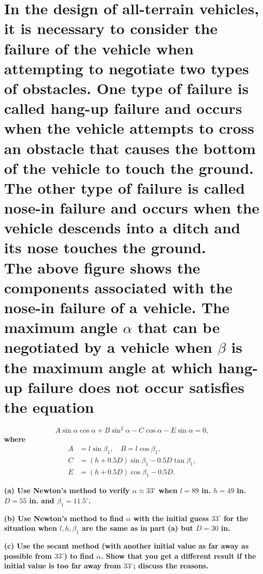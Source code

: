 \documentclass[a4paper]{article}
\begin{document}
\section*{In the design of all-terrain vehicles, it is necessary to consider the failure of the vehicle when attempting to negotiate two types of obstacles. One type of failure is called hang-up failure and occurs when the vehicle attempts to cross an obstacle that causes the bottom of the vehicle to touch the ground. The other type of failure is called nose-in failure and occurs when the vehicle descends into a ditch and its nose touches the ground.\\
The above figure shows the components associated with the nose-in failure of a vehicle. The maximum angle $\alpha$ that can be negotiated by a vehicle when $\beta$ is the maximum angle at which hang-up failure does not occur satisfies the equation}
\[
A\sin\alpha\cos\alpha + B\sin^2\alpha - C\cos\alpha - E\sin\alpha = 0,
\]
\textbf{where}
\[
\begin{aligned}
A &= l\sin\beta_1, \quad B = l\cos\beta_1, \\
C &= (h + 0.5 D)\sin\beta_1 - 0.5 D\tan\beta_1, \\
E &= (h + 0.5 D)\cos\beta_1 - 0.5 D.
\end{aligned}
\]

\textbf{(a) Use Newton's method to verify $\alpha \approx 33^{\circ}$ when $l = 89$ in. $h = 49$ in. $D = 55$ in. and $\beta_1 = 11.5^{\circ}$.}

\textbf{(b) Use Newton's method to find $\alpha$ with the initial guess $33^{\circ}$ for the situation when $l, h, \beta_1$ are the same as in part (a) but $D = 30$ in.}

\textbf{(c) Use the secant method (with another initial value as far away as possible from $33^{\circ}$) to find $\alpha$. Show that you get a different result if the initial value is too far away from $33^{\circ}$; discuss the reasons.}


\end{document}
